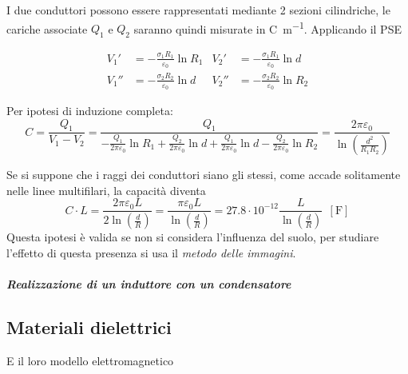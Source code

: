 I due conduttori possono essere rappresentati mediante 2 sezioni cilindriche,
le cariche associate $Q_1$ e $Q_2$ saranno quindi misurate in \si{\coulomb\per\meter}.
Applicando il PSE

\begin{align*}
V_1' &= -\frac{\sigma_1 R_1}{\varepsilon_0} \ln R_1 & V_2' &= -\frac{\sigma_1 R_1}{\varepsilon_0} \ln d\\
V_1'' &= -\frac{\sigma_2 R_2}{\varepsilon_0} \ln d & V_2'' &= -\frac{\sigma_2 R_2}{\varepsilon_0} \ln R_2
\end{align*}

Per ipotesi di induzione completa:
$$
C = \frac{Q_1}{V_1-V_2} = \frac{Q_1}{-\frac{Q_1}{2\pi\varepsilon_0}\ln R_1 + \frac{Q_2}{2\pi\varepsilon_0}\ln d + \frac{Q_1}{2\pi\varepsilon_0}\ln d - \frac{Q_2}{2 \pi \varepsilon_0} \ln R_2} = \frac{2\pi\varepsilon_0}{\ln \left(\frac{d^2}{R_1R_2}\right)}
$$

Se si suppone che i raggi dei conduttori siano gli stessi, come accade solitamente nelle linee multifilari, la capacità diventa
$$
C\cdot L = \frac{2\pi\varepsilon_0 L}{2 \ln \left(\frac{d}{R}\right)} = \frac{\pi \varepsilon_0 L}{\ln \left(\frac{d}{R}\right)} = 27.8\cdot 10^{-12} \frac{L}{\ln\left(\frac{d}{R}\right)}\ \ [\si{\farad}]
$$
Questa ipotesi è valida se non si considera l'influenza del suolo, per studiare l'effetto di questa 
presenza si usa il \textit{metodo delle immagini}.

\subparagraph{Realizzazione di un induttore con un condensatore}



\subsection{Materiali dielettrici}
E il loro modello elettromagnetico
